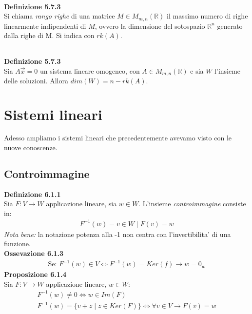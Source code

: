 \documentclass{article}
\begin{document}
\vspace{3em}
\textbf{\\Definizione 5.7.3}
\\Si chiama \textit{rango righe} di una matrice $M \in M_{m,n}(\mathbb{R})$ il massimo numero di righe linearmente indipendenti di $M$, ovvero la dimensione del sotospazio $\mathbb{R}^n$ generato dalla righe di M. Si indica con $rk(A)$.
\vspace{2em}

\textbf{\\Definizione 5.7.3}
\\Sia $A\vec{x}=0$ un sistema lineare omogeneo, con $A\in M_{m,n}(\mathbb{R})$ e sia $W$ l'insieme delle soluzioni. Allora $dim(W)=n-rk(A)$.

\pagebreak
\section{Sistemi lineari}
Adesso ampliamo i sistemi lineari che precedentemente avevamo visto con le nuove conoscenze.
\subsection{Controimmagine}

\textbf{Definizione 6.1.1} \\
Sia $F : V \to W$ applicazione lineare, sia $w \in W$. L'insieme \textit{controimmagine} consiste in:
\begin{align*}
  F^{-1}(w)={v \in W \mid F(v)=w}
\end{align*}
\textit{Nota bene:} la notazione potenza alla -1 non centra con l'invertibilita' di una funzione. \\
\textbf{Ossevazione 6.1.3} \\
\begin{align*}
  \text{Se: } F^{-1}(w)\in V \iff F^{-1}(w)=Ker(f) \to w=0_w
\end{align*}
\textbf{Proposizione 6.1.4}
\\ Sia $F : V \to W$ applicazione lineare, $w \in W$:
\begin{align*}
  F^{-1}(w)\neq{0} \iff w\in Im(F)\\
  F^{-1}(w)=\{v+z \mid z\in Ker(F)\} \iff \forall v \in V \to F(v)=w
\end{align*}
\end{document}
